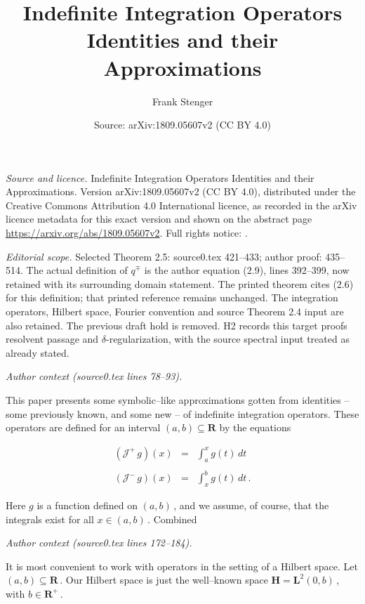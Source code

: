 \documentclass[10pt,a4paper]{amsart}
\title[Indefinite integration operators]{Indefinite Integration Operators Identities and their Approximations}
\author{Frank Stenger}
\date{Source: arXiv:1809.05607v2 (CC BY 4.0)}
\begin{document}
\maketitle

{\raggedright \noindent\emph{Source and licence.} Indefinite Integration Operators Identities and their Approximations. Version arXiv:1809.05607v2 (CC BY 4.0), distributed under the Creative Commons Attribution 4.0 International licence, as recorded in the arXiv licence metadata for this exact version and shown on the abstract page \url{https://arxiv.org/abs/1809.05607v2}. Full rights notice: .\par\smallskip\par}

\noindent\textit{Editorial scope.} Selected Theorem 2.5: source0.tex 421--433; author proof: 435--514. The actual definition of $q^\mp$ is the author equation (2.9), lines 392--399, now retained with its surrounding domain statement. The printed theorem cites (2.6) for this definition; that printed reference remains unchanged. The integration operators, Hilbert space, Fourier convention and source Theorem 2.4 input are also retained. The previous draft hold is removed. H2 records this target proof\textquotesingle s resolvent passage and $\delta$-regularization, with the source spectral input treated as already stated.\par\smallskip
\par\medskip\noindent\textit{Author context (source0.tex lines 78--93).}\par\smallskip
\vspace{.1in} \noindent This paper presents some symbolic--like
approximations gotten from identities -- some previously known, and
some new -- of indefinite integration operators.  These operators are
defined for an interval $(a,b) \subseteq {\mathbf R}$ by the equations

\begin{equation}%
  \begin{array}{rcl}
    ({\mathcal J}^+\,g)(x) & = & \displaystyle \int_a^x g(t) \, dt \\
    && \\
    ({\mathcal J}^-\,g)(x) & = & \displaystyle \int_x^b g(t) \, dt\,.
    \label{equation:1.1}
    \end{array}
\end{equation}
                                                                  
\noindent Here $g$ is a function defined on $(a,b)$\,, and we assume,
of course, that the integrals exist for all $x \in (a,b)$\,.  Combined
\par\medskip\noindent\textit{Author context (source0.tex lines 172--184).}\par\smallskip
It is most convenient to work with operators in the setting of a
Hilbert space.  Let $(a,b) \subseteq {\mathbf R}$\,.  Our Hilbert
space is just the well--known space ${\mathbf H} = {\mathbf
  L}^2(0,b)$\,, with $b \in {\mathbf R}^+$\,.
\end{document}
